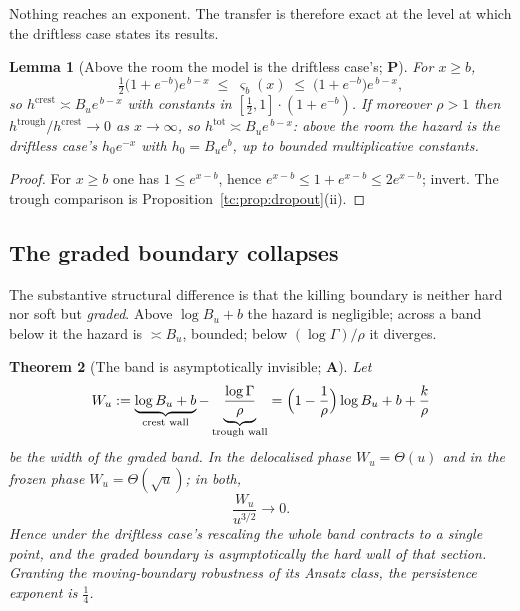 \documentclass[11pt]{article}
\numberwithin{equation}{section}
\theoremstyle{plain}
\newtheorem{theorem}{Theorem}[section]
\newtheorem{lemma}[theorem]{Lemma}
\theoremstyle{definition}
\theoremstyle{remark}
\begin{document}
\noindent Nothing reaches an exponent. The transfer is therefore exact
at the level at which the driftless case states its results.

\begin{lemma}[Above the room the model is the driftless case's; \textbf{P}]
\label{tc:lem:aboveroom}
For $x\ge b$,
\begin{equation}\label{tc:eq:sandwich}
\tfrac12\bigl(1+e^{-b}\bigr)e^{\,b-x}\;\le\;\varsigma_b(x)\;\le\;
\bigl(1+e^{-b}\bigr)e^{\,b-x},
\end{equation}
so $h^{\mathrm{crest}}\asymp B_ue^{\,b-x}$ with constants in
$[\tfrac12,1]\cdot(1+e^{-b})$. If moreover $\rho>1$ then
$h^{\mathrm{trough}}/h^{\mathrm{crest}}\to0$ as $x\to\infty$, so
$h^{\mathrm{tot}}\asymp B_ue^{\,b-x}$: above the room the hazard is
the driftless case's $h_{0}e^{-x}$ with $h_{0}=B_ue^{b}$, up to bounded
multiplicative constants.
\end{lemma}

\begin{proof}
For $x\ge b$ one has $1\le e^{x-b}$, hence
$e^{x-b}\le1+e^{x-b}\le2e^{x-b}$; invert. The trough comparison is
Proposition~\ref{tc:prop:dropout}(ii).
\end{proof}

\subsection{The graded boundary collapses}\label{tc:subsub:collapse}

The substantive structural difference is that the killing boundary is
neither hard nor soft but \emph{graded}. Above $\log B_u+b$ the hazard
is negligible; across a band below it the hazard is $\asymp B_u$,
bounded; below $(\log\Gamma)/\rho$ it diverges.

\begin{theorem}[The band is asymptotically invisible; \textbf{A}]
\label{tc:thm:collapse}
Let
\begin{equation}\label{tc:eq:band}
W_u:=\underbrace{\log B_u+b}_{\text{crest wall}}
-\underbrace{\frac{\log\Gamma}{\rho}}_{\text{trough wall}}
=\Bigl(1-\frac1\rho\Bigr)\log B_u+b+\frac{k}{\rho}
\end{equation}
be the width of the graded band. In the delocalised phase
$W_u=\Theta(u)$ and in the frozen phase $W_u=\Theta(\sqrt u)$; in both,
\[
\frac{W_u}{u^{3/2}}\longrightarrow0 .
\]
Hence under the driftless case's rescaling the whole band contracts to a single
point, and the graded boundary is asymptotically the hard wall of that
section. Granting the moving-boundary robustness of its Ansatz class,
the persistence exponent is $\tfrac14$.
\end{theorem}
\end{document}
